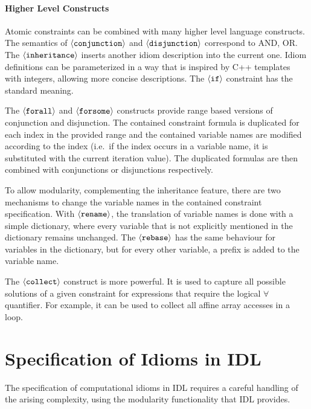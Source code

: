     \paragraph{Higher Level Constructs}
    Atomic constraints can be combined with many higher level language
    constructs.
    The semantics of $\left<\text{\tt conjunction}\right>$ and $\left<\text{\tt disjunction}\right>$ correspond to AND, OR.
    The $\left<\text{\tt inheritance}\right>$ inserts another idiom description
    into the current one.
    Idiom definitions can be parameterized in a way that is inspired by C++
    templates with integers, allowing more concise descriptions.
    The $\left<\text{\tt if}\right>$ constraint has the standard meaning.

    The $\left<\text{\tt forall}\right>$ and $\left<\text{\tt forsome}\right>$
    constructs provide range based versions of conjunction and disjunction.
    The contained constraint formula is duplicated for each index in the
    provided range and the contained variable names are modified according to
    the index (i.e.\ if the index occurs in a variable name, it is substituted
    with the current iteration value).
    The duplicated formulas are then combined with conjunctions or disjunctions
    respectively.

    To allow modularity, complementing the inheritance feature, there are two
    mechanisms to change the variable names in the contained constraint
    specification.
    With $\left<\text{\tt rename}\right>$, the translation of variable names is
    done with a simple dictionary, where every variable that is not explicitly
    mentioned in the dictionary remains unchanged.
    The $\left<\text{\tt rebase}\right>$ has the same behaviour for variables in
    the dictionary, but for every other variable, a prefix is added to the
    variable name.

    The $\left<\text{\tt collect}\right>$ construct is more powerful.
    It is used to capture all possible solutions of a given constraint for
    expressions that require the logical $\forall$ quantifier.
    For example, it can be used to collect all affine array accesses in a loop.

\section{Specification of Idioms in IDL}
\label{sec:idioms}

    The specification of computational idioms in IDL requires a careful
    handling of the arising complexity, using the modularity functionality that
    IDL provides.

